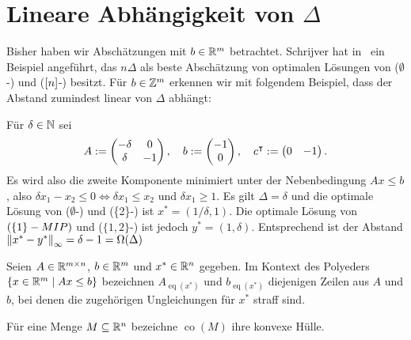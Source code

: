 \newcommand{\one}{\mathbbm{1}}
\newcommand{\eq}[1]{{\operatorname{eq}(#1)}}
\newcommand{\co}[1]{\operatorname{co}(#1)}

\section{Lineare Abhängigkeit von $\Delta$}\label{sec:linear}

Bisher haben wir Abschätzungen mit $b\in\mathbb{R}^m$ betrachtet.
Schrijver hat in~\cite[Kapitel~17.2]{Schrijver1986} ein Beispiel angeführt, das $n\Delta$ als beste Abschätzung von optimalen Lösungen von ($\emptyset$-\MIPR) und ($[n]$-\MIPR) besitzt.
Für $b\in\mathbb{Z}^m$ erkennen wir mit folgendem Beispiel, dass der Abstand zumindest linear von $\Delta$ abhängt:
\begin{example}
	Für $\delta\in\mathbb{N}$ sei
	$$A:=
	\begin{pmatrix}
	-\delta & 0  \\
	\delta  & -1
	\end{pmatrix},\quad
	b:=\begin{pmatrix} -1 \\ 0 \end{pmatrix},\quad
	c^\intercal:=\begin{pmatrix}0 & -1\end{pmatrix}.
	$$
	Es wird also die zweite Komponente minimiert unter der Nebenbedingung $Ax\leq b$, also $\delta x_1-x_2\leq0\Leftrightarrow\delta x_1\leq x_2$ und $\delta x_1\geq 1$.
	Es gilt $\Delta=\delta$ und die optimale Lösung von ($\emptyset$-\MIPI) und (\{2\}-\MIPI) ist $x^*=(1/\delta,1)$.
	Die optimale Lösung von $(\{1\}-MIP)$ und ($\{1, 2\}$-\MIPI) ist jedoch $y^*=(1,\delta)$.
	Entsprechend ist der Abstand $\left\lVert x^*-y^*\right\rVert_\infty=\delta-1=\Omega(\Delta)$
\end{example}

\begin{notation}
	Seien $A\in\mathbb{R}^{m\times n}$, $b\in\mathbb{R}^m$ und $x^*\in\mathbb{R}^n$ gegeben.
	Im Kontext des Polyeders $\{ x\in\mathbb{R}^m \mid Ax\leq b \}$ bezeichnen
	$A_\eq{x^*}$ und $b_\eq{x^*}$ diejenigen Zeilen aus $A$ und $b$, bei denen die zugehörigen Ungleichungen für $x^*$ straff sind.
	
	Für eine Menge $M\subseteq \mathbb{R}^n$ bezeichne $\co{M}$ ihre konvexe Hülle.
\end{notation}


